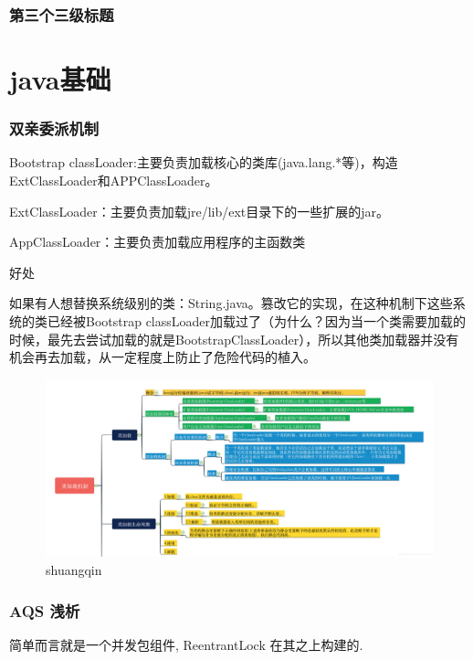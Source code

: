 \documentclass[UTF8]{ctexart}
\begin{document}
\subsubsection{第三个三级标题}


\section{java基础}
\subsubsection{双亲委派机制}
Bootstrap classLoader:主要负责加载核心的类库(java.lang.*等)，构造ExtClassLoader和APPClassLoader。

ExtClassLoader：主要负责加载jre/lib/ext目录下的一些扩展的jar。

AppClassLoader：主要负责加载应用程序的主函数类

好处

如果有人想替换系统级别的类：String.java。篡改它的实现，在这种机制下这些系统的类已经被Bootstrap classLoader加载过了（为什么？因为当一个类需要加载的时候，最先去尝试加载的就是BootstrapClassLoader），所以其他类加载器并没有机会再去加载，从一定程度上防止了危险代码的植入。

\begin{figure}
	\centering
	\includegraphics[width=1\linewidth]{figures/shuangqin.png}
	\caption{shuangqin}
	\label{fig:shuangqin}
\end{figure}


\subsubsection{AQS 浅析}
简单而言就是一个并发包组件, ReentrantLock 在其之上构建的.
\end{document}
